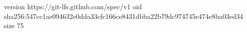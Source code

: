 version https://git-lfs.github.com/spec/v1
oid sha256:547cc1ae094632e0dda33cfc166ce8431dbba22b79dc974745e474e8ba03ed34
size 75
